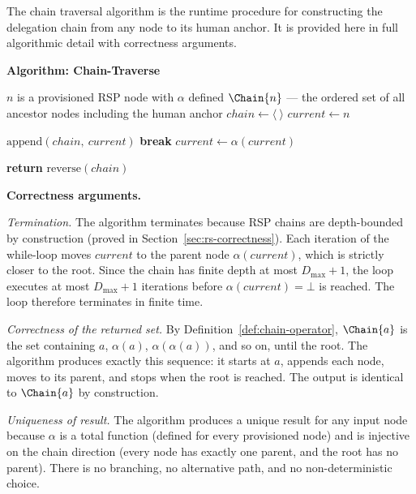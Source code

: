 The chain traversal algorithm is the runtime procedure for constructing the delegation chain from any node to its human anchor. It is provided here in full algorithmic detail with correctness arguments.

\medskip
\noindent\textbf{Algorithm: Chain-Traverse}

\begin{algorithm}
\caption{Chain-Traverse($n$) — Build the delegation chain from node $n$ to the human anchor}
\label{alg:chain-traverse}
\begin{algorithmic}[1]
\REQUIRE $n$ is a provisioned RSP node with $\alpha$ defined
\ENSURE $\Chain{n}$ — the ordered set of all ancestor nodes including the human anchor
\STATE $chain \leftarrow \langle\ \rangle$ 
\STATE $current \leftarrow n$ 

    \STATE $\text{append}(chain,\ current)$ 
        \STATE \textbf{break} 
    \ENDIF
    \STATE $current \leftarrow \alpha(current)$ 
\ENDWHILE

\STATE \textbf{return} $\text{reverse}(chain)$ 
\end{algorithmic}
\end{algorithm}

\medskip
\noindent\textbf{Correctness arguments.}

\textit{Termination.} The algorithm terminates because RSP chains are depth-bounded by construction (proved in Section~\ref{sec:rs-correctness}). Each iteration of the while-loop moves $current$ to the parent node $\alpha(current)$, which is strictly closer to the root. Since the chain has finite depth at most $D_{\max} + 1$, the loop executes at most $D_{\max} + 1$ iterations before $\alpha(current) = \bot$ is reached. The loop therefore terminates in finite time.

\textit{Correctness of the returned set.} By Definition~\ref{def:chain-operator}, $\Chain{a}$ is the set containing $a$, $\alpha(a)$, $\alpha(\alpha(a))$, and so on, until the root. The algorithm produces exactly this sequence: it starts at $a$, appends each node, moves to its parent, and stops when the root is reached. The output is identical to $\Chain{a}$ by construction.

\textit{Uniqueness of result.} The algorithm produces a unique result for any input node because $\alpha$ is a total function (defined for every provisioned node) and is injective on the chain direction (every node has exactly one parent, and the root has no parent). There is no branching, no alternative path, and no non-deterministic choice.

